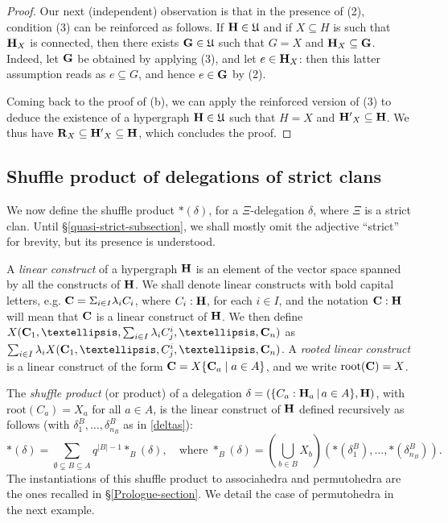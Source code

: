 \documentclass[11pt]{article}
\theoremstyle{definition}
\numberwithin{equation}{section}
\numberwithin{equation}{section}
\newcommand{\inc}{\subseteq}
\newcommand{\set}[1]{\{#1\}}
\newcommand{\setc}[2]{\set{#1 \mid #2}}
\newcommand{\Union}{\bigcup}		%
\newcommand{\hyper}[1]{{\bf #1}}
\newcommand{\incs}{\subsetneq}
\begin{document}
\begin{proof}
Our next (independent) observation is that in the presence of (2), condition (3) can be reinforced as follows. If  $\hyper{H}\in\mathfrak{U}$ and if $X\inc H$ is such that $\hyper{H}_X$ is connected, then there exists $\hyper{G}\in\mathfrak{U}$ such that $G=X$ and $\hyper{H}_X\inc\hyper{G}$.  Indeed, let $\hyper{G}$ be obtained by applying (3), and let $e\in\hyper{H}_X$: then this latter assumption reads as $e\inc G$, and hence $e\in \hyper{G}$ by (2).

Coming back to the proof of (b), we can apply the reinforced version of (3) to deduce the existence of a hypergraph $\hyper{H}\in\mathfrak{U}$ such that
$H=X$ and $\hyper{H'}_X\inc\hyper{H}$. We thus have $\hyper{R}_X\inc\hyper{H'}_X\inc \hyper{H}$, which concludes the proof.
\end{proof}


 \subsection{Shuffle product of delegations of strict clans}\label{asp}
 
We now define the   shuffle product $\ast(\delta)$, for a $\Xi$-delegation $\delta$, where  $\Xi$ is a strict clan. Until \S\ref{quasi-strict-subsection}, we shall mostly omit  the adjective ``strict'' for brevity, but its presence is understood. 

A {\it linear construct} of a hypergraph ${\bf H}$ is an element of the vector space spanned by all the constructs of ${\bf H}$. We shall denote linear constructs with bold capital letters, e.g. ${\bf C}=\Sigma_{i\in I} {\lambda_i}C_i$, where $C_i:{\bf H}$, for each $i\in I$, and the notation ${\bf C}:{\bf H}$ will mean that ${\bf C}$ is a linear construct of ${\bf H}$.   We then define $X({\bf C}_1,\dots,\sum_{i\in I}\lambda_i C^i_{j},\dots,{\bf C}_n)$ as $\sum_{i\in I}\lambda_i X({\bf C}_1,\dots,C^i_{j},\dots,{\bf C}_n)$.  A {\em rooted linear construct} is a linear construct of the form  ${\bf C}=X\setc{{\bf C}_a}{a\in A}$, and we write $\mbox{root}({\bf C})=X$.

 The  {\it   shuffle product}  (or   product) of a  delegation $\delta=(\{C_a:{\bf H}_a\,|\, a\in A\},{\bf H})$, with $\mbox{root}(C_a)=X_a$ for all $a\in A$,  is  the  linear construct of  $\hyper{H}$ defined recursively as follows (with $\delta^B_1,\ldots, \delta^B_{n_{B}}$  as in \eqref{deltas}):
\begin{equation} \label{shuffle-def} 
\ast(\delta)= \sum_{\emptyset\incs B\subseteq A} q^{{|B|}-1}\ast_B(\delta), \quad \mbox{where}\;
\ast_B(\delta)=(\Union_{b\in B}X_b)(\ast(\delta^B_1),\dots,\ast(\delta^B_{n_{B}})).
\end{equation}
The instantiations of this shuffle product  to associahedra and permutohedra are  the ones recalled  in \S\ref{Prologue-section}. We detail the case of permutohedra in the next example.
\end{document}
